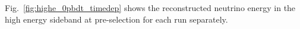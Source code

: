 Fig.~\ref{fig:highe_0pbdt_timedep} shows the reconstructed neutrino energy in the high energy sideband at pre-selection for each run separately.

